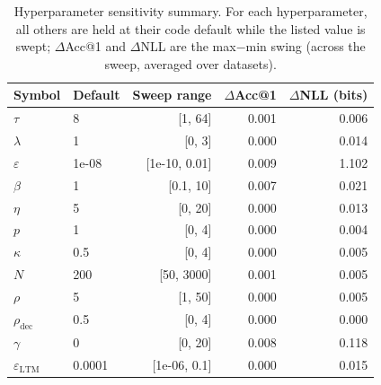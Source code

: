 \begin{table}[h!]
\centering
\small
\caption{Hyperparameter sensitivity summary. For each hyperparameter, all others are held at their code default while the listed value is swept; $\Delta$Acc@1 and $\Delta$NLL are the max$-$min swing (across the sweep, averaged over datasets).}
\label{tab:hp-sensitivity}
\begin{tabular}{llrrr}
\toprule
\textbf{Symbol} & \textbf{Default} & \textbf{Sweep range} & $\Delta$\textbf{Acc@1} & $\Delta$\textbf{NLL (bits)} \\
\midrule
$\tau$ & 8 & [1, 64] & 0.001 & 0.006 \\
$\lambda$ & 1 & [0, 3] & 0.000 & 0.014 \\
$\varepsilon$ & 1e-08 & [1e-10, 0.01] & 0.009 & 1.102 \\
$\beta$ & 1 & [0.1, 10] & 0.007 & 0.021 \\
$\eta$ & 5 & [0, 20] & 0.000 & 0.013 \\
$p$ & 1 & [0, 4] & 0.000 & 0.004 \\
$\kappa$ & 0.5 & [0, 4] & 0.000 & 0.005 \\
$N$ & 200 & [50, 3000] & 0.001 & 0.005 \\
$\rho$ & 5 & [1, 50] & 0.000 & 0.005 \\
$\rho_{\mathrm{dec}}$ & 0.5 & [0, 4] & 0.000 & 0.000 \\
$\gamma$ & 0 & [0, 20] & 0.008 & 0.118 \\
$\varepsilon_{\mathrm{LTM}}$ & 0.0001 & [1e-06, 0.1] & 0.000 & 0.015 \\
\bottomrule
\end{tabular}
\end{table}
